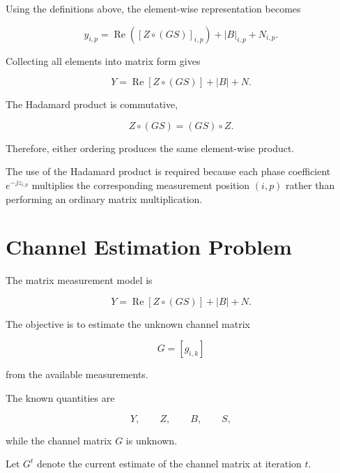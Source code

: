 \documentclass[12pt,a4paper]{article}
\begin{document}
Using the definitions above, the element-wise representation becomes

\begin{equation}
y_{i,p}
=
\operatorname{Re}
\left(
[Z\circ(GS)]_{i,p}
\right)
+
|B|_{i,p}
+
N_{i,p}.
\tag{162}
\end{equation}

Collecting all elements into matrix form gives

\begin{equation}
\boxed{
Y
=
\operatorname{Re}
[Z\circ(GS)]
+
|B|
+
N
}.
\tag{163}
\end{equation}

The Hadamard product is commutative,

\begin{equation}
Z\circ(GS)
=
(GS)\circ Z.
\tag{164}
\end{equation}

Therefore, either ordering produces the same element-wise product.

The use of the Hadamard product is required because each phase coefficient $e^{-jz_{i,p}}$ multiplies the corresponding measurement position $(i,p)$ rather than performing an ordinary matrix multiplication.

\section{Channel Estimation Problem}

The matrix measurement model is

\begin{equation}
Y
=
\operatorname{Re}
[Z\circ(GS)]
+
|B|
+
N.
\tag{165}
\end{equation}

The objective is to estimate the unknown channel matrix

\begin{equation}
G=[g_{i,k}]
\tag{166}
\end{equation}

from the available measurements.

The known quantities are

\begin{equation}
Y,\qquad Z,\qquad B,\qquad S,
\tag{167}
\end{equation}

while the channel matrix $G$ is unknown.

Let $G^{t}$ denote the current estimate of the channel matrix at iteration $t$.
\end{document}
